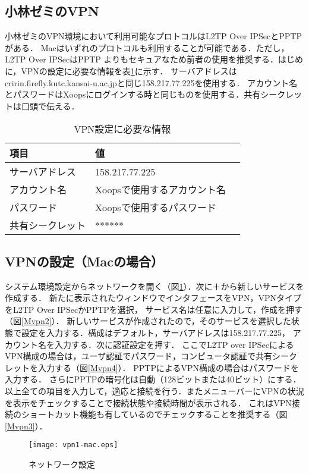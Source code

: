 \newpage

\subsection{小林ゼミのVPN}
小林ゼミのVPN環境において利用可能なプロトコルはL2TP Over IPSecとPPTPがある．
Macはいずれのプロトコルも利用することが可能である．ただし，L2TP Over IPSecはPPTP
よりもセキュアなため前者の使用を推奨する．はじめに，VPNの設定に必要な情報を表\ref{servers}に示す．
サーバアドレスはcririn.firefly.kutc.kansai-u.ac.jpと同じ158.217.77.225を使用する．
アカウント名とパスワードはXoopsにログインする時と同じものを使用する．共有シークレットは口頭で伝える．
\begin{table}[htbp]
\begin{center}
\caption{VPN設定に必要な情報}
\label{servers}
\begin{tabular}{| l | l |c|}
	\hline
	項目 & 値  \\ \hline
	サーバアドレス & 158.217.77.225 \\ 
	 アカウント名 & Xoopsで使用するアカウント名 \\
  	パスワード & Xoopsで使用するパスワード \\ 
	 共有シークレット & ****** \\ \hline
\end{tabular}
\end{center}
\end{table}
\subsection{VPNの設定（Macの場合）}
システム環境設定からネットワークを開く（図\ref{Mvpn1}）．次に＋から新しいサービスを作成する．
新たに表示されたウィンドウでインタフェースをVPN，VPNタイプをL2TP Over IPSecかPPTPを選択，
サービス名は任意に入力して，作成を押す（図\ref{Mvpn2}）．
新しいサービスが作成されたので，そのサービスを選択した状態で設定を入力する．構成はデフォルト，サーバアドレスは158.217.77.225，
アカウント名を入力する．次に認証設定を押す．
ここでL2TP over IPSecによるVPN構成の場合は，ユーザ認証でパスワード，コンピュータ認証で共有シークレットを入力する（図\ref{Mvpn4}）．
PPTPによるVPN構成の場合はパスワードを入力する．
さらにPPTPの暗号化は自動（128ビットまたは40ビット）にする．
以上全ての項目を入力して，適応と接続を行う．またメニューバーにVPNの状況を表示をチェックすることで接続状態や接続時間が表示される．
これはVPN接続のショートカット機能も有しているのでチェックすることを推奨する（図\ref{Mvpn3}）．
\begin{figure}[htbp]
 \begin{center}
  \texttt{[image: vpn1-mac.eps]}
 \end{center}
 \caption{ネットワーク設定}
 \label{Mvpn1}
\end{figure}

